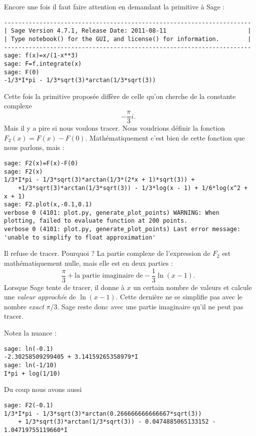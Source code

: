 \begin{example}
Encore une fois il faut faire attention en demandant la primitive à Sage :
\begin{verbatim}
----------------------------------------------------------------------
| Sage Version 4.7.1, Release Date: 2011-08-11                       |
| Type notebook() for the GUI, and license() for information.        |
----------------------------------------------------------------------
sage: f(x)=x/(1-x**3)
sage: F=f.integrate(x)
sage: F(0)
-1/3*I*pi - 1/3*sqrt(3)*arctan(1/3*sqrt(3))
\end{verbatim}
Cette fois la primitive proposée diffère de celle qu'on cherche de la constante complexe
\begin{equation}
    -\frac{ \pi }{ 3 }i.
\end{equation}
Mais il y a pire si nous voulons tracer. Nous voudrions définir la fonction \( F_2(x)=F(x)-F(0)\). Mathématiquement c'est bien de cette fonction que nous parlons, mais :
\begin{verbatim}
sage: F2(x)=F(x)-F(0)
sage: F2(x)
1/3*I*pi - 1/3*sqrt(3)*arctan(1/3*(2*x + 1)*sqrt(3)) + 
    +1/3*sqrt(3)*arctan(1/3*sqrt(3)) - 1/3*log(x - 1) + 1/6*log(x^2 + x + 1)
sage: F2.plot(x,-0.1,0.1)
verbose 0 (4101: plot.py, generate_plot_points) WARNING: When plotting, failed to evaluate function at 200 points.
verbose 0 (4101: plot.py, generate_plot_points) Last error message: 'unable to simplify to float approximation'
\end{verbatim}
Il refuse de tracer. Pourquoi ? La partie complexe de l'expression de \( F_2\) est mathématiquement nulle, mais elle est en deux parties :
\begin{equation}
    \frac{ \pi }{ 3 }+\text{la partie imaginaire de} -\frac{1}{ 3 }\ln(x-1).
\end{equation}
Lorsque Sage tente de tracer, il donne à \( x\) un certain nombre de valeurs et calcule une \emph{valeur approchée} de \( \ln(x-1)\). Cette dernière ne se simplifie pas avec le nombre \emph{exact} \( \pi/3\). Sage reste donc avec une partie imaginaire qu'il ne peut pas tracer.

Notez la nuance :
\begin{verbatim}
sage: ln(-0.1)
-2.30258509299405 + 3.14159265358979*I
sage: ln(-1/10)
I*pi + log(1/10)
\end{verbatim}
Du coup nous avons aussi
\begin{verbatim}
sage: F2(-0.1)
1/3*I*pi - 1/3*sqrt(3)*arctan(0.266666666666667*sqrt(3)) 
    + 1/3*sqrt(3)*arctan(1/3*sqrt(3)) - 0.0474885065133152 - 1.04719755119660*I
\end{verbatim}

\end{example}

